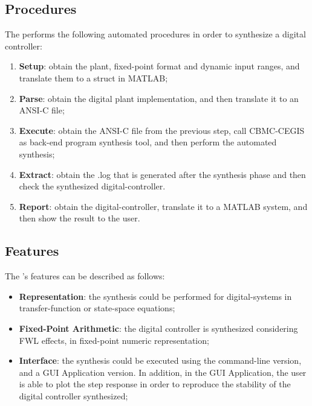 \subsection{\tool Procedures}

The \tool performs the following automated procedures in order to synthesize a digital controller:

\begin{enumerate}
\item \textbf{Setup}: obtain the plant, fixed-point format and dynamic input ranges, and translate them to a struct in MATLAB;
\item \textbf{Parse}: obtain the digital plant implementation, and then translate it to an ANSI-C file;
\item \textbf{Execute}: obtain the ANSI-C file from the previous step, call CBMC-CEGIS as back-end program synthesis tool, and then perform the automated synthesis;
\item \textbf{Extract}: obtain the .log that is generated after the synthesis phase and then check the synthesized digital-controller.
\item \textbf{Report}: obtain the digital-controller, translate it to a MATLAB system, and then show the result to the user.
\end{enumerate}

\subsection{\tool Features}

The \tool's features can be described as follows:

\begin{itemize}
\item \textbf{Representation}: the synthesis could be performed for digital-systems in transfer-function or state-space equations;
\item \textbf{Fixed-Point Arithmetic}: the digital controller is synthesized considering FWL effects, in fixed-point numeric representation;
\item \textbf{Interface}: the synthesis could be executed using the command-line version, and a GUI Application version. In addition, in the GUI Application, the user is able to plot the step response in order to reproduce the stability of the digital controller synthesized;
\end{itemize}
